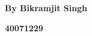\documentclass[12pt]{article}
\begin{document}
\vspace{\baselineskip}
\begin{FlushRight}
\textbf{By Bikramjit Singh}
\end{FlushRight}\par

\begin{FlushRight}
\textbf{40071229}
\end{FlushRight}\par


\vspace{\baselineskip}

\vspace{\baselineskip}

\vspace{\baselineskip}

\vspace{\baselineskip}

\vspace{\baselineskip}

\vspace{\baselineskip}

\vspace{\baselineskip}

\vspace{\baselineskip}

\vspace{\baselineskip}

\vspace{\baselineskip}

\vspace{\baselineskip}

\vspace{\baselineskip}

\vspace{\baselineskip}

\vspace{\baselineskip}

\vspace{\baselineskip}

\vspace{\baselineskip}

\vspace{\baselineskip}

\vspace{\baselineskip}

\vspace{\baselineskip}

\vspace{\baselineskip}

\vspace{\baselineskip}
\end{document}
